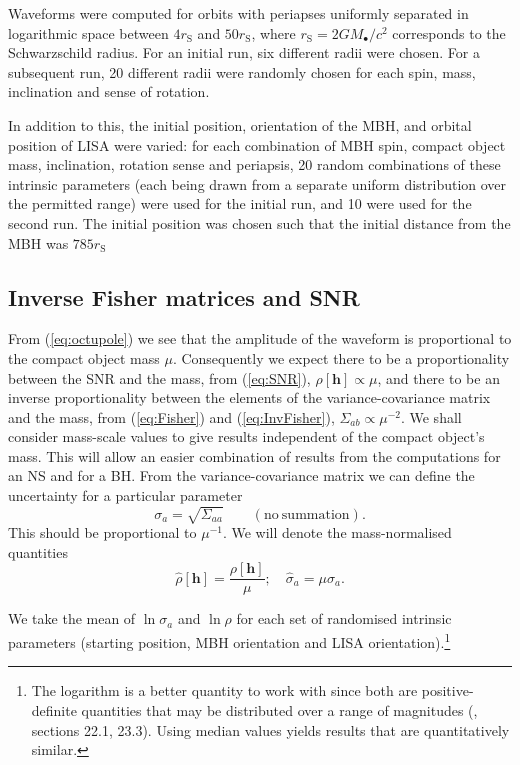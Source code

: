 \documentclass[useAMS,usedcolumn,usegraphicx,usenatbib]{mn2e}
\newcommand{\eqnref}[1]{(\ref{eq:#1})}
\newcommand{\sub}[1]{\ensuremath{_\mathrm{#1}}}
\begin{document}
Waveforms were computed for orbits with periapses uniformly separated in logarithmic space between $4 r\sub{S}$ and $50 r\sub{S}$, where $r\sub{S} = 2 GM_\bullet / c^2$ corresponds to the Schwarzschild radius. For an initial run, six different radii were chosen. For a subsequent run, 20 different radii were randomly chosen for each spin, mass, inclination and sense of rotation.

In addition to this, the initial position, orientation of the MBH, and orbital position of LISA were varied: for each combination of MBH spin, compact object mass, inclination, rotation sense and periapsis, 20 random combinations of these intrinsic parameters (each being drawn from a separate uniform distribution over the permitted range) were used for the initial run, and 10 were used for the second run. The initial position was chosen such that the initial distance from the MBH was $785 r\sub{S}$

\subsection{Inverse Fisher matrices and SNR}

From \eqnref{octupole} we see that the amplitude of the waveform is proportional to the compact object mass $\mu$. Consequently we expect there to be a proportionality between the SNR and the mass, from \eqnref{SNR}, $\rho[\boldsymbol{h}] \propto \mu$, and there to be an inverse proportionality between the elements of the variance-covariance matrix and the mass, from \eqnref{Fisher} and \eqnref{InvFisher}, $\Sigma_{ab} \propto \mu^{-2}$. We shall consider mass-scale values to give results independent of the compact object's mass. This will allow an easier combination of results from the computations for an NS and for a BH. From the variance-covariance matrix we can define the uncertainty for a particular parameter
\begin{equation}
\sigma_a = \sqrt{\Sigma_{aa}} \qquad \mathrm{(no\ summation)}.
\end{equation}
This should be proportional to $\mu^{-1}$. We will denote the mass-normalised quantities
\begin{equation}
\hat{\rho}[\boldsymbol{h}] = \frac{\rho[\boldsymbol{h}]}{\mu}; \quad \hat{\sigma}_a = \mu\sigma_a.
\end{equation}

We take the mean of $\ln \sigma_a$ and $\ln \rho$ for each set of randomised intrinsic parameters (starting position, MBH orientation and LISA orientation).\footnote{The logarithm is a better quantity to work with since both are positive-definite quantities that may be distributed over a range of magnitudes (\citealt{Mackay2003}, sections 22.1, 23.3). Using median values yields results that are quantitatively similar.}
\end{document}
